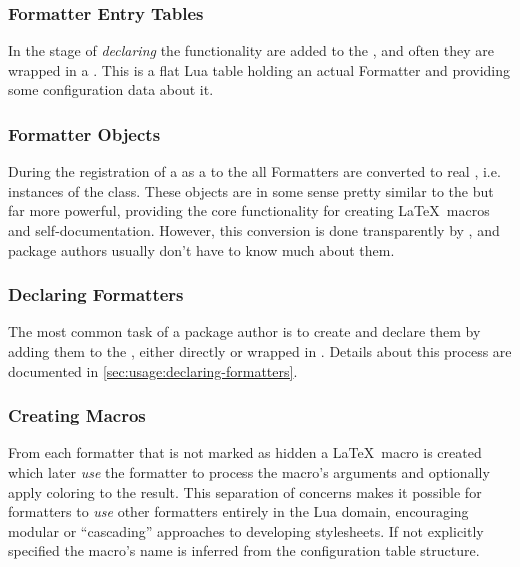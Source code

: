\documentclass[12pt]{scrartcl}
\begin{document}
\subsubsection{Formatter Entry Tables}
\label{sec:intro-formatter-entry-tables}

In the stage of \emph{declaring} the functionality 
are added to the , and often they are wrapped in a
.  This is a flat Lua table holding an actual
Formatter and providing some configuration data about it.


\subsubsection{Formatter Objects}
\label{sec:intro-formatter-objects}

During the registration of a  as a  to the
 all Formatters are converted to real , i.e. instances of the  class.
These objects are in some sense pretty similar to the  but far more powerful, providing the core
functionality for creating \LaTeX\ macros and self-documentation. However, this
conversion is done transparently by \luaformatters, and package authors
usually don't have to know much about them.

\subsubsection{Declaring Formatters}
\label{sec:intro-declaring-formatters}

The most common task of a package author is to create  and declare them by adding them to the , either directly or wrapped in .  Details about this process are documented in \vref{sec:usage:declaring-formatters}.


\subsubsection{Creating Macros}
\label{sec:intro-creating-macros}

From each formatter that is not marked as hidden a
\LaTeX\ macro is created which later \emph{use} the formatter to process the
macro's arguments and optionally apply coloring to the result. This separation
of concerns makes it possible for formatters to \emph{use} other formatters
entirely in the Lua domain, encouraging modular or “cascading” approaches to
developing stylesheets. If not explicitly specified the macro's name is inferred
from the configuration table structure.
\end{document}
